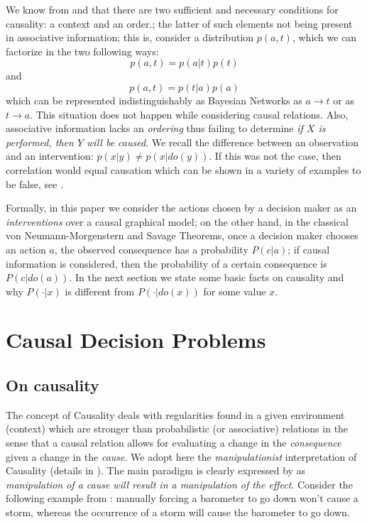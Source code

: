 \documentclass[review]{elsarticle}
\begin{document}
We know from \cite{granger1969investigating} and \cite{lamport1978time} that there are two sufficient and necessary conditions for causality: a context and an order.; the latter of such elements not being present in associative information; this is, consider a distribution $p(a,t)$, which we can factorize in the two following ways:
\begin{equation}
    p(a,t)=p(a|t)p(t)
\end{equation}
and
\begin{equation}
    p(a,t)=p(t|a)p(a)
\end{equation}
which can be represented indistinguishably as Bayesian Networks as $a \to t$ or as $t \to a$. This situation does not happen while considering causal relations. Also, associative information lacks an \textit{ordering} thus failing to determine \textit{if $X$ is performed, then $Y$ will be caused}. We recall the difference between an observation and an intervention: $p(x|y) \neq p(x | do(y))$. If this was not the case, then correlation would equal causation which can be shown in a variety of examples to be false, see \cite{pearl2009causality}.

Formally, in this paper we consider the actions chosen by a decision maker as an \textit{interventions} over a causal graphical model; on the other hand, in the classical von Neumann-Morgenstern and Savage Theorems, once a decision maker chooses an action $a$, the observed consequence has a probability $P(c|a)$; if causal information is considered, then the probability of a certain consequence is $P(c|do(a))$. In the next section we state some basic facts on causality and why $P(\cdot |x)$ is different from $P(\cdot | do(x))$ for some value $x$.

\section{Causal Decision Problems}
\label{causal_decision_problems}
\subsection{On causality}
\label{on_causality}
The concept of Causality deals with regularities found in a given environment (context) which are stronger than probabilistic (or associative) relations in the sense that a causal relation allows for evaluating a change in the \textit{consequence} given a change in the \textit{cause}. We adopt here the \textit{manipulationist} interpretation of Causality (details in \cite{woodward2005making}). The main paradigm is clearly expressed by \cite{campbell1979quasi} as \textit{manipulation of a cause will result in a manipulation of the effect}. Consider the following example from \cite{woodward2005making}: manually forcing a barometer to go down won't cause a storm, whereas the occurrence of a storm will cause the barometer to go down. 
\end{document}
